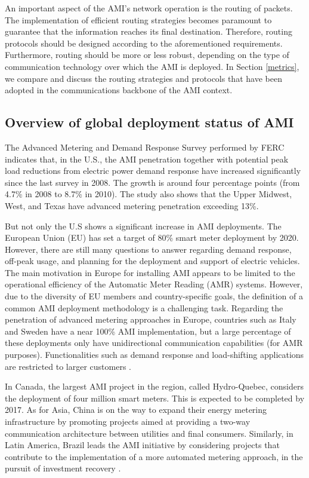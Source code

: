 \documentclass[10pt,twocolumn,twoside,submit]{JCNtran}
\begin{document}
An important aspect of the AMI's network operation is the routing of packets. The implementation of efficient routing strategies becomes paramount to guarantee that the information reaches its final destination. Therefore, routing protocols should be designed according to the aforementioned requirements. Furthermore, routing should be more or less robust, depending on the type of communication technology over which the AMI is deployed. In Section \ref{metrics}, we compare and discuss the routing strategies and protocols that have been adopted in the communications backbone of the AMI context.

\subsection{Overview of global deployment status of AMI}\label{overview}

The Advanced Metering and Demand Response Survey performed by FERC \cite{FERC2012} indicates that, in the U.S., the AMI penetration together with potential peak load reductions from electric power demand response have increased significantly since the last survey in 2008. The growth is around four percentage points (from 4.7\% in 2008 to 8.7\% in 2010). The study also shows that the Upper Midwest, West, and Texas have advanced metering penetration exceeding 13\%.

But not only the U.S shows a significant increase in AMI deployments. The European Union (EU) has set a target of 80\% smart meter deployment by 2020. However, there are still many questions to answer regarding demand response, off-peak usage, and planning for the deployment and support of electric vehicles. The main motivation in Europe for installing AMI appears to be limited to the operational efficiency of the Automatic Meter Reading (AMR) systems. However, due to the diversity of EU members and country-specific goals, the definition of a common AMI deployment methodology is a challenging task. Regarding the penetration of advanced metering approaches in Europe, countries such as Italy and Sweden have a near 100\% AMI implementation, but a large percentage of these deployments only have unidirectional communication capabilities (for AMR purposes). Functionalities such as demand response and load-shifting applications are restricted to larger customers \cite{FERC2012}.

In Canada, the largest AMI project in the region, called Hydro-Quebec, considers the deployment of four million smart meters. This is expected to be completed by 2017. As for Asia, China is on the way to expand their energy metering infrastructure by promoting projects aimed at providing a two-way communication architecture between utilities and final consumers. Similarly, in Latin America, Brazil leads the AMI initiative by considering projects that contribute to the implementation of a more automated metering approach, in the pursuit of investment recovery \cite{Namboodiri2012}.
\end{document}
